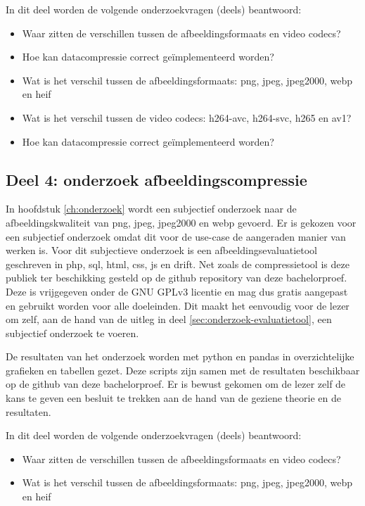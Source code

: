 In dit deel worden de volgende onderzoekvragen (deels) beantwoord: 
\begin{itemize}
	\item Waar zitten de verschillen tussen de \glspl{afbeeldingsformaat} en video \glspl{codec}?
	\item Hoe kan \gls{datacompressie} correct geïmplementeerd worden?
	\item Wat is het verschil tussen de \glspl{afbeeldingsformaat}: \gls{png}, \gls{jpeg}, \gls{jpeg2000}, \gls{webp} en \gls{heif}
	\item Wat is het verschil tussen de video \glspl{codec}: \gls{h264-avc}, \gls{h264-svc}, \gls{h265} en \gls{av1}?
	\item Hoe kan \gls{datacompressie} correct geïmplementeerd worden?
\end{itemize}

\subsection{Deel 4: onderzoek afbeeldingscompressie}
\label{sec:aanpak-bachelorproef-deel-4}

In hoofdstuk \ref{ch:onderzoek} wordt een subjectief onderzoek naar de afbeeldingskwaliteit van \gls{png}, \gls{jpeg}, \gls{jpeg2000} en \gls{webp} gevoerd. Er is gekozen voor een subjectief onderzoek omdat dit voor de \gls{use-case} de aangeraden manier van werken is. Voor dit subjectieve onderzoek is een \gls{afbeeldingsevaluatietool} geschreven in \gls{php}, \gls{sql}, \gls{html}, \gls{css}, \gls{js} en \gls{drift}. Net zoals de \gls{compressietool} is deze publiek ter beschikking gesteld op de \gls{github} repository van deze bachelorproef. Deze is vrijgegeven onder de GNU GPLv3 licentie en mag dus gratis aangepast en gebruikt worden voor alle doeleinden. Dit maakt het eenvoudig voor de lezer om zelf, aan de hand van de uitleg in deel \ref{sec:onderzoek-evaluatietool}, een subjectief onderzoek te voeren.

De resultaten van het onderzoek worden met \gls{python} en \gls{pandas} in overzichtelijke grafieken en tabellen gezet. Deze scripts zijn samen met de resultaten beschikbaar op de \gls{github} van deze bachelorproef. Er is bewust gekomen om de lezer zelf de kans te geven een besluit te trekken aan de hand van de geziene theorie en de resultaten.

In dit deel worden de volgende onderzoekvragen (deels) beantwoord: 
\begin{itemize}
	\item Waar zitten de verschillen tussen de \glspl{afbeeldingsformaat} en video \glspl{codec}?
	\item Wat is het verschil tussen de \glspl{afbeeldingsformaat}: \gls{png}, \gls{jpeg}, \gls{jpeg2000}, \gls{webp} en \gls{heif}
\end{itemize}

